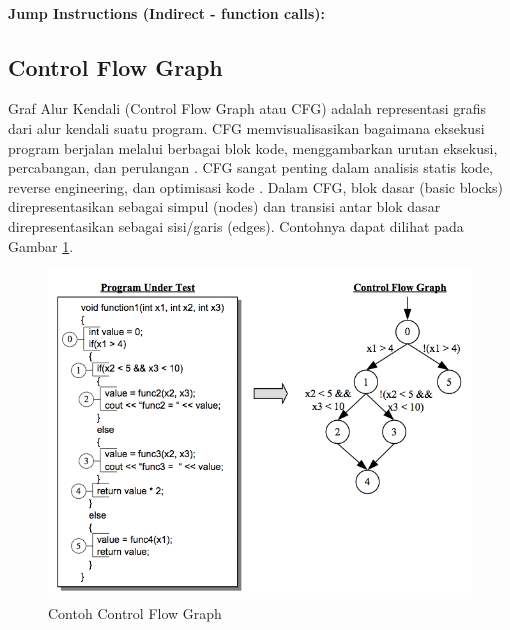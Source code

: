 \paragraph{Jump Instructions (Indirect - function calls):}

\subsection{Control Flow Graph}
Graf Alur Kendali (Control Flow Graph atau CFG) adalah representasi grafis dari alur kendali suatu program. CFG memvisualisasikan bagaimana eksekusi program berjalan melalui berbagai blok kode, menggambarkan urutan eksekusi, percabangan, dan perulangan \cite{Myi19}. CFG sangat penting dalam analisis statis kode, reverse engineering, dan optimisasi kode \cite{Rou05}. Dalam CFG, blok dasar (basic blocks) direpresentasikan sebagai simpul (nodes) dan transisi antar blok dasar direpresentasikan sebagai sisi/garis (edges). Contohnya dapat dilihat pada Gambar \ref{F:graph}.

\begin{figure}
	\centering
	\includegraphics[width=1\textwidth]
	{assets/pics/control_flow_graph.png}
	\caption{Contoh Control Flow Graph \cite{Gom}}
	\label{F:graph}
\end{figure}

